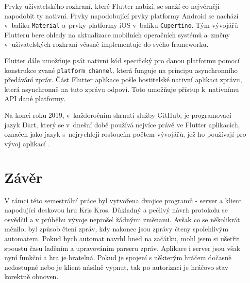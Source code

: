 \documentclass[12pt, a4paper]{article}
\let\oldsection\section
\renewcommand\section{\clearpage\oldsection}
\begin{document}
Prvky uživatelského rozhraní, které Flutter nabízí, se snaží co nejvěrněji napodobit ty nativní. Prvky napodobující prvky platformy Android se nachází v~balíku \texttt{Material} a~prvky platformy iOS v~balíku \texttt{Cupertino}. Tým vývojářů Flutteru bere ohledy na aktualizace mobilních operačních systémů a~změny v~uživatelských rozhraní včasně implementuje do svého frameworku.

Flutter dále umožňuje psát nativní kód specifický pro danou platformu pomocí konstrukce zvané \texttt{platform channel}, která funguje na principu asynchronního předávání zpráv. Část Flutter aplikace pošle hostitelské nativní aplikaci zprávu, která asynchronně na tuto zprávu odpoví. Toto umožňuje přístup k~nativnímu API dané platformy.

Na konci roku 2019, v~každoročním shrnutí služby GitHub, je programovací jazyk Dart, který se v~dnešní době používá nejvíce právě ve Flutter aplikacích, označen jako jazyk s~nejrychleji rostoucím počtem vývojářů, jež ho používají pro vývoj aplikací \cite{the_state_of_the_octoverse_2019}.

        \section{Závěr}
    V rámci této semestrální práce byl vytvořena dvojice programů - server a klient napodující deskovou hru Kris Kros. Důkladný a pečlivý návrh protokolu se osvědčil a v průběhu vývoje neprošel žádnými změnami. Avšak co se několikrát měnilo, byl způsob čtení zpráv, kdy nakonec jsou zprávy čteny spolehlivým automatem. Pokud bych automat navrhl hned na začátku, mohl jsem si ušetřit spoustu času laděním a upravováním parseru zpráv. Aplikace i server jsou však nyní funkční a hra je hratelná. Pokud je spojení s některým hráčem dočasně nedostupné nebo je klient násilně vypnut, tak po autorizaci je hráčovo stav korektně obnoven.
    



	
	
\end{document}
